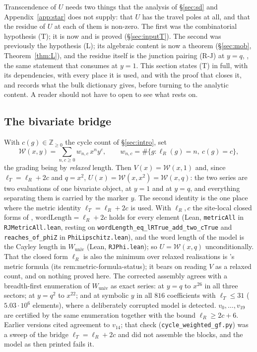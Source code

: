 \documentclass[11pt]{article}
\theoremstyle{plain}
\theoremstyle{definition}
\theoremstyle{remark}
\newcommand{\Z}{\mathbb{Z}}
\begin{document}
Transcendence of $U$ needs two things that the analysis of \S\ref{sec:sd} and
Appendix~\ref{app:star} does not supply: that $U$ has the travel poles at all, and that the residue
of $U$ at each of them is non-zero. The first was the combinatorial hypothesis \textup{(T)}; it is
now {\cite[Proposition ``Invariance of the travel block'', \textup{prop:travelinv}]{Bonfioli2026bA}} and is proved (\S\ref{sec:inputT}). The second was previously
the hypothesis \textup{(L)}; its algebraic content is now a theorem (\S\ref{sec:mob},
Theorem~\ref{thm:L}), and the residue itself is the junction pairing \textup{(R-J)} at $y=q$,
{\cite[Theorem ``closed form of the junction pairing'', \textup{thm:RJ}]{Bonfioli2026bA}}, the same statement that {\cite[Theorem \textup{thm:V}]{Bonfioli2026bA}} consumes at $y=1$. This section
states \textup{(T)} in full, with its dependencies, with every place it is used, and with the proof
that closes it, and records what the bulk dictionary gives, before turning to the analytic content. A reader
should not have to open \cite{supplement} to see what {\cite[Theorem \textup{thm:U}]{Bonfioli2026bA}} rests on.

\subsection{The bivariate bridge}\label{sec:bridge}

With $c(g)\in\Z_{\ge0}$ the cycle count of \S\ref{sec:intro}, set
\[
   \mathcal W(x,y)=\sum_{n,c\ge0}w_{n,c}\,x^ny^c,\qquad
   w_{n,c}=\#\{g:\ell_R(g)=n,\ c(g)=c\},
\]
the grading being by \emph{relaxed} length. Then $V(x)=\mathcal W(x,1)$ and, since
$\ell_T=\ell_R+2c$ and $q=x^2$, $U(x)=\mathcal W(x,x^2)=\mathcal W(x,q)$: the two series are two
evaluations of one bivariate object, at $y=1$ and at $y=q$, and everything separating them is
carried by the marker $y$. The second identity is the one place where the metric identity
$\ell_T=\ell_R+2c$ is used. With $\ell_R,c$ the site-local closed forms of \cite{Bonfioli2026a},
$\mathrm{wordLength}=\ell_R+2c$ holds for every element (Lean, \texttt{metricAll} in
\texttt{RJMetricAll.lean}, resting on \texttt{wordLength\_eq\_lRTrue\_add\_two\_cTrue} and
\texttt{reaches\_of\_phiZ} in \texttt{PhiLipschitz.lean}), and the word length of the model is the
Cayley length in $W_{\mathrm{univ}}$ (Lean, \texttt{RJPhi.lean}); so $U=\mathcal W(x,q)$
unconditionally. That the closed form $\ell_R$ is also the minimum over relaxed realisations is
\cite{Bonfioli2026a}'s metric formula (its \textup{rem:metric-formula-status}); it bears on reading
$V$ as a relaxed count, and on nothing proved here.
The corrected assembly {\cite[\textup{(eq:assembly)}]{Bonfioli2026bA}} agrees with a breadth-first enumeration of
$W_{\mathrm{univ}}$ as exact series: at $y=q$ to $x^{26}$ in all three sectors; at $y=q^2$ to
$x^{22}$; and at symbolic $y$ in all $816$ coefficients with $\ell_T\le31$ ($5.03\cdot10^6$
elements), where a deliberately corrupted model is detected. $v_0,\dots,v_{19}$ are certified by the
same enumeration together with the bound $\ell_R\ge2c+6$. Earlier versions cited agreement to
$v_{14}$; that check (\texttt{cycle\_weighted\_gf.py}) was a sweep of the bridge
$\ell_T=\ell_R+2c$ and did not assemble the blocks, and the model as then printed fails it.
\end{document}
